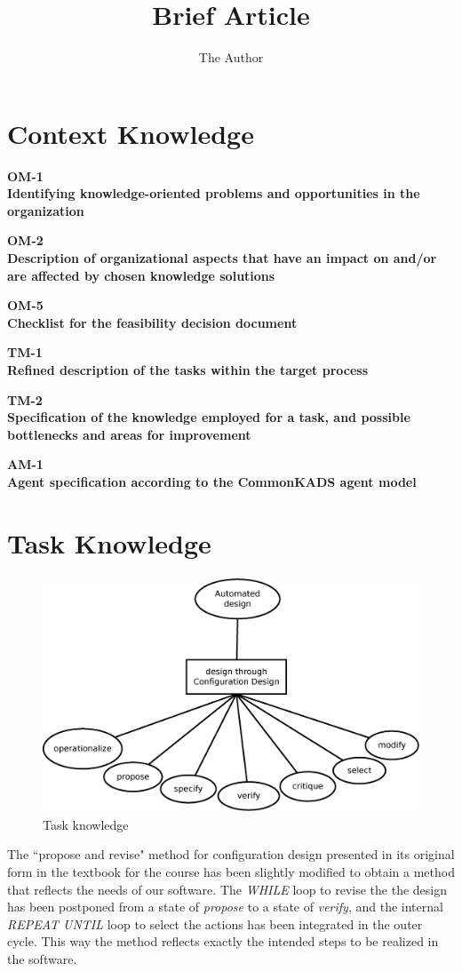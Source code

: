 \documentclass[11pt]{article} %
\title{Brief Article}
\author{The Author}
\def\worksheet#1#2{%
  \clearpage
  
  \begin{center}
  {\large\bf #1} \\
  {\normalsize\bf #2} \\[12pt]
  \begin{footnotesize}
  
  \end{footnotesize}
  \end{center}  
  \vfill}
\begin{document}
\maketitle


\section{Context Knowledge}
\worksheet{OM-1}{Identifying knowledge-oriented problems and
opportunities in the organization}

\worksheet{OM-2}{Description of organizational aspects that
have an impact on and/or are affected by chosen knowledge solutions}

\worksheet{OM-5}{Checklist for the feasibility decision
document}

\worksheet{TM-1}{Refined description of the tasks within the
target process}

\worksheet{TM-2}{Specification of the knowledge employed for a
task, and possible bottlenecks and areas for improvement}

\worksheet{AM-1}{Agent specification according to the
CommonKADS agent model}


\clearpage
\section{Task Knowledge}

\begin{figure}[h]
\centering
\includegraphics[height=7cm]{images/task_knowledge.eps}
\caption{Task knowledge}
\label{fig:taskknowledge}
\end{figure}

The ``propose and revise" method for configuration design presented in its original form in the textbook for the course has been slightly modified to obtain a method that reflects the needs of our software. The \textit{WHILE} loop to revise the the design has been postponed from a state of \textit{propose} to a state of \textit{verify}, and the internal \textit{REPEAT UNTIL} loop to select the actions has been integrated in the outer cycle. This way the method reflects exactly the intended steps to be realized in the software. 
\end{document}
